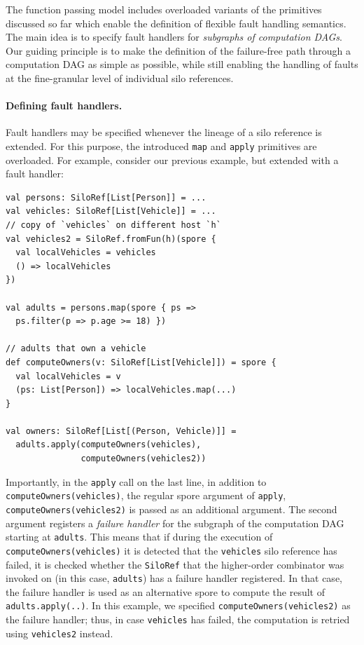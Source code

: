\documentclass{jfp1}
\begin{document}
The function passing model includes overloaded variants of
the primitives discussed so far which enable the definition of flexible fault
handling semantics. The main idea is to specify fault handlers for {\em
subgraphs of computation DAGs}. Our guiding principle is to make the definition
of the failure-free path through a computation DAG as simple as possible, while
still enabling the handling of faults at the fine-granular level of individual
silo references.

\paragraph{Defining fault handlers.}

Fault handlers may be specified whenever the lineage of a silo reference is
extended. For this purpose, the introduced \verb|map| and \verb|apply|
primitives are overloaded. For example, consider our previous example, but
extended with a fault handler:

\begin{lstlisting}
val persons: SiloRef[List[Person]] = ...
val vehicles: SiloRef[List[Vehicle]] = ...
// copy of `vehicles` on different host `h`
val vehicles2 = SiloRef.fromFun(h)(spore {
  val localVehicles = vehicles
  () => localVehicles
})

val adults = persons.map(spore { ps =>
  ps.filter(p => p.age >= 18) })

// adults that own a vehicle
def computeOwners(v: SiloRef[List[Vehicle]]) = spore {
  val localVehicles = v
  (ps: List[Person]) => localVehicles.map(...)
}

val owners: SiloRef[List[(Person, Vehicle)]] =
  adults.apply(computeOwners(vehicles),
               computeOwners(vehicles2))
\end{lstlisting}

Importantly, in the \verb|apply| call on the last line, in addition to
\verb|computeOwners(vehicles)|, the regular spore argument of \verb|apply|,
\verb|computeOwners(vehicles2)| is passed as an additional argument. The second
argument registers a {\em failure handler} for the subgraph of the computation
DAG starting at \verb|adults|. This means that if during the execution of
\verb|computeOwners(vehicles)| it is detected that the \verb|vehicles| silo
reference has failed, it is checked whether the \verb|SiloRef| that the
higher-order combinator was invoked on (in this case, \verb|adults|) has a
failure handler registered. In that case, the failure handler is used as an
alternative spore to compute the result of \verb|adults.apply(..)|. In this
example, we specified \verb|computeOwners(vehicles2)| as the failure handler;
thus, in case \verb|vehicles| has failed, the computation is retried using
\verb|vehicles2| instead.
\end{document}
